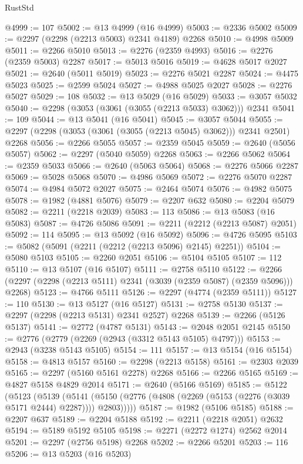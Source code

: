 \begin{lexlean}{RustStd}
\begin{coremodule}
@4999 := 107
@5002 := @13 @4999 (@16 @4999)
@5003 := @2336 @5002
@5009 := @2297 (@2298 (@2213 @5003) @2341 @4189) @2268
@5010 := @4998 @5009
@5011 := @2266 @5010
@5013 := @2276 (@2359 @4993)
@5016 := @2276 (@2359 @5003) @2287
@5017 := @5013 @5016
@5019 := @4628 @5017 @2027
@5021 := @2640 (@5011 @5019)
@5023 := @2276 @5021 @2287
@5024 := @4475 @5023
@5025 := @2599 @5024
@5027 := @4988 @5025 @2027
@5028 := @2276 @5027
@5029 := 108
@5032 := @13 @5029 (@16 @5029)
@5033 := @3057 @5032
@5040 := @2298 (@3053 (@3061 (@3055 (@2213 @5033) @3062))) @2341
@5041 := 109
@5044 := @13 @5041 (@16 @5041)
@5045 := @3057 @5044
@5055 := @2297 (@2298 (@3053 (@3061 (@3055 (@2213 @5045) @3062))) @2341 @2501) @2268
@5056 := @2266 @5055
@5057 := @2359 @5045
@5059 := @2640 (@5056 @5057)
@5062 := @2297 (@5040 @5059) @2268
@5063 := @2266 @5062
@5064 := @2359 @5033
@5066 := @2640 (@5063 @5064)
@5068 := @2276 @5066 @2287
@5069 := @5028 @5068
@5070 := @4986 @5069
@5072 := @2276 @5070 @2287
@5074 := @4984 @5072 @2027
@5075 := @2464 @5074
@5076 := @4982 @5075
@5078 := @1982 (@4881 @5076)
@5079 := @2207 @632
@5080 := @2204 @5079
@5082 := @2211 (@2218 @2039)
@5083 := 113
@5086 := @13 @5083 (@16 @5083)
@5087 := @4726 @5086
@5091 := @2211 (@2212 (@2213 @5087) @2051)
@5092 := 114
@5095 := @13 @5092 (@16 @5092)
@5096 := @4726 @5095
@5103 := @5082 (@5091 (@2211 (@2212 (@2213 @5096) @2145) @2251))
@5104 := @5080 @5103
@5105 := @2260 @2051
@5106 := @5104 @5105
@5107 := 112
@5110 := @13 @5107 (@16 @5107)
@5111 := @2758 @5110
@5122 := @2266 (@2297 (@2298 (@2213 @5111) @2341 (@3039 (@2359 @5087) (@2359 @5096))) @2268)
@5123 := @4766 @5111
@5126 := @2297 (@4774 (@2359 @5111))
@5127 := 110
@5130 := @13 @5127 (@16 @5127)
@5131 := @2758 @5130
@5137 := @2297 (@2298 (@2213 @5131) @2341 @2527) @2268
@5139 := @2266 (@5126 @5137)
@5141 := @2772 (@4787 @5131)
@5143 := @2048 @2051 @2145
@5150 := @2776 (@2779 (@2269 (@2943 (@3312 @5143 @5105) @4797)))
@5153 := @2943 (@3238 @5143 @5105)
@5154 := 111
@5157 := @13 @5154 (@16 @5154)
@5158 := @4813 @5157
@5160 := @2298 (@2213 @5158)
@5161 := @2303 @2039
@5165 := @2297 (@5160 @5161 @2278) @2268
@5166 := @2266 @5165
@5169 := @4827 @5158 @4829 @2014
@5171 := @2640 (@5166 @5169)
@5185 := @5122
    (@5123
      (@5139
        (@5141 (@5150 (@2776 (@4808 (@2269 (@5153 (@2276 (@3039 @5171 @2444) @2287)))) @2803)))))
@5187 := @1982 (@5106 @5185)
@5188 := @2207 @637
@5189 := @2204 @5188
@5192 := @2211 (@2218 @2051) @2632
@5194 := @5189 @5192 @5105
@5198 := @2271 (@2272 @1274) @2562 @2014
@5201 := @2297 (@2756 @5198) @2268
@5202 := @2266 @5201
@5203 := 116
@5206 := @13 @5203 (@16 @5203)

\end{coremodule}
\end{lexlean}
